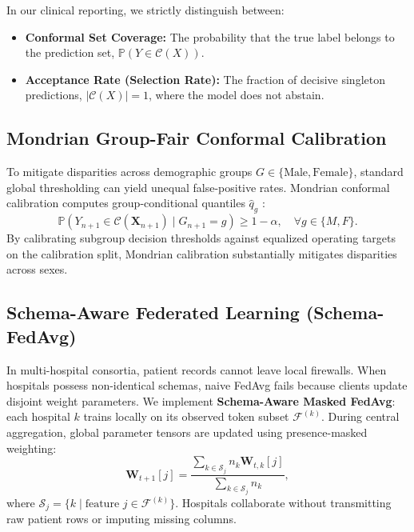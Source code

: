 \documentclass[journal]{IEEEtran}
\begin{document}
In our clinical reporting, we strictly distinguish between:
\begin{itemize}
    \item \textbf{Conformal Set Coverage:} The probability that the true label belongs to the prediction set, $\mathbb{P}(Y \in \mathcal{C}(X))$.
    \item \textbf{Acceptance Rate (Selection Rate):} The fraction of decisive singleton predictions, $|\mathcal{C}(X)| = 1$, where the model does not abstain.
\end{itemize}

\subsection{Mondrian Group-Fair Conformal Calibration}
To mitigate disparities across demographic groups $G \in \{\text{Male}, \text{Female}\}$, standard global thresholding can yield unequal false-positive rates. Mondrian conformal calibration computes group-conditional quantiles $\hat{q}_g$ \cite{gupta2021}:
\begin{equation}
\mathbb{P}(Y_{n+1} \in \mathcal{C}(\mathbf{X}_{n+1}) \mid G_{n+1} = g) \ge 1 - \alpha, \quad \forall g \in \{M, F\}.
\end{equation}
By calibrating subgroup decision thresholds against equalized operating targets on the calibration split, Mondrian calibration substantially mitigates disparities across sexes.

\subsection{Schema-Aware Federated Learning (Schema-FedAvg)}
In multi-hospital consortia, patient records cannot leave local firewalls. When hospitals possess non-identical schemas, naive FedAvg \cite{mcmahan2017} fails because clients update disjoint weight parameters. We implement \textbf{Schema-Aware Masked FedAvg}: each hospital $k$ trains locally on its observed token subset $\mathcal{F}^{(k)}$. During central aggregation, global parameter tensors are updated using presence-masked weighting:
\begin{equation}
\mathbf{W}_{t+1}[j] = \frac{\sum_{k \in \mathcal{S}_j} n_k \mathbf{W}_{t,k}[j]}{\sum_{k \in \mathcal{S}_j} n_k},
\end{equation}
where $\mathcal{S}_j = \{k \mid \text{feature } j \in \mathcal{F}^{(k)}\}$. Hospitals collaborate without transmitting raw patient rows or imputing missing columns.
\end{document}
